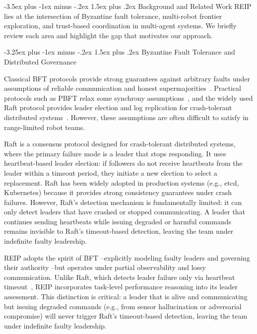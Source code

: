 \documentclass[conference]{IEEEtran}
\makeatletter
\renewcommand{\section}{\@startsection{section}{1}{\z@}%
  {-3.5ex plus -1ex minus -.2ex}%
  {1.5ex plus .2ex}%
  {\normalfont\large\bfseries\centering}}
\renewcommand{\subsection}{\@startsection{subsection}{2}{\z@}%
  {-3.25ex plus -1ex minus -.2ex}%
  {1.5ex plus .2ex}%
  {\normalfont\normalsize\itshape\centering}}
\makeatother
\begin{document}
\section{Background and Related Work}
\label{sec:related_work}
REIP lies at the intersection of Byzantine fault tolerance, multi-robot frontier exploration, and trust-based coordination in multi-agent systems. We briefly review each area and highlight the gap that motivates our approach.

\subsection{Byzantine Fault Tolerance and Distributed Governance}

Classical BFT protocols provide strong guarantees against arbitrary faults under assumptions of reliable communication and honest supermajorities~\cite{lamport1982byzantine}. Practical protocols such as PBFT relax some synchrony assumptions~\cite{castro1999practical}, and the widely used Raft protocol provides leader election and log replication for crash-tolerant distributed systems~\cite{ongaro2014raft}. However, these assumptions are often difficult to satisfy in range-limited robot teams.

Raft is a consensus protocol designed for crash-tolerant distributed systems, where the primary failure mode is a leader that stops responding. It uses heartbeat-based leader election: if followers do not receive heartbeats from the leader within a timeout period, they initiate a new election to select a replacement. Raft has been widely adopted in production systems (e.g., etcd, Kubernetes) because it provides strong consistency guarantees under crash failures. However, Raft's detection mechanism is fundamentally limited: it can only detect leaders that have crashed or stopped communicating. A leader that continues sending heartbeats while issuing degraded or harmful commands remains invisible to Raft's timeout-based detection, leaving the team under indefinite faulty leadership.

REIP adopts the spirit of BFT --explicitly modeling faulty leaders and governing their authority --but operates under partial observability and lossy communication. Unlike Raft, which detects leader failure only via heartbeat timeout~\cite{ongaro2014raft}, REIP incorporates task-level performance reasoning into its leader assessment. This distinction is critical: a leader that is alive and communicating but issuing degraded commands (e.g., from sensor hallucination or adversarial compromise) will never trigger Raft's timeout-based detection, leaving the team under indefinite faulty leadership.
\end{document}
